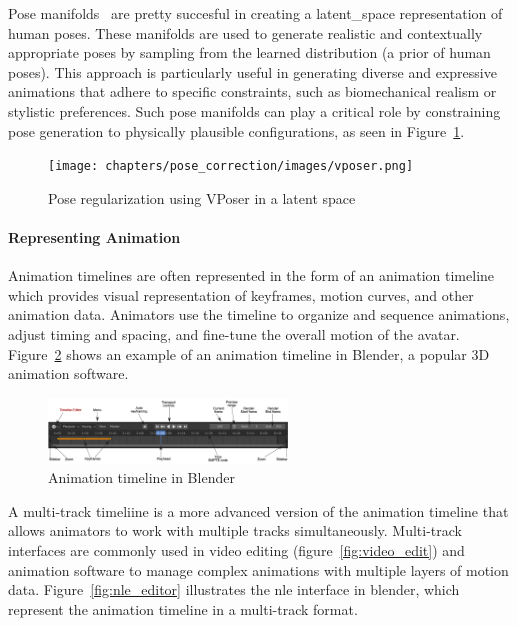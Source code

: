 \documentclass[../../main.tex]{subfiles}
\begin{document}
Pose manifolds~\cite{pavlakos2019expressive,tiwari2022pose, lu2023dposer} are pretty succesful in creating a \gls{latent_space} representation of human poses. These manifolds are used to generate realistic and contextually appropriate poses by sampling from the learned distribution (a prior of human poses). This approach is particularly useful in generating diverse and expressive animations that adhere to specific constraints, such as biomechanical realism or stylistic preferences. Such pose manifolds can play a critical role by constraining pose generation to physically plausible configurations, as seen in Figure~\ref{fig:vposer}.

\begin{figure}
  \centering \texttt{[image: chapters/pose\_correction/images/vposer.png]}
  \caption{Pose regularization using VPoser in a latent space}
  \label{fig:vposer}
\end{figure}

\paragraph{Representing Animation}
\label{ch:background_work:sign_language_synthesis:3d_techniques:avatar_animation:animation_timeline}

Animation timelines are often represented in the form of an animation timeline which provides visual representation of keyframes, motion curves, and other animation data. Animators use the timeline to organize and sequence animations, adjust timing and spacing, and fine-tune the overall motion of the avatar. Figure~\ref{fig:animation_timeline} shows an example of an animation timeline in Blender, a popular 3D animation software.

\begin{figure} 
  \centering \includegraphics[width = 2.5in]{chapters/background_work/images/animation_timeline.png} 
  \caption{Animation timeline in Blender} 
  \label{fig:animation_timeline}
\end{figure}

A multi-track timeliine is a more advanced version of the animation timeline that allows animators to work with multiple tracks simultaneously. Multi-track interfaces are commonly used in video editing (figure~\ref{fig:video_edit}) and animation software to manage complex animations with multiple layers of motion data. Figure~\ref{fig:nle_editor} illustrates the \gls{nle} interface in blender, which represent the animation timeline in a multi-track format.
\end{document}
